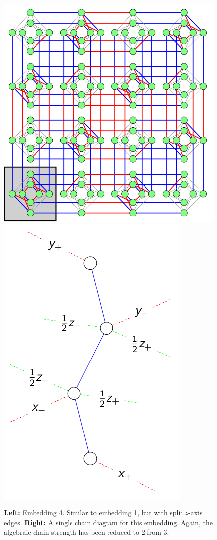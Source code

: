 \documentclass[11pt]{report}
\newcommand{\?}{\stackrel{?}{=}}
\begin{document}
\begin{figure}[h!]
  \centerline{\includegraphics[width=\linewidth/3]{resources/images/emb4.png}\hspace{1cm}\includegraphics[height=\linewidth/3]{resources/images/emb4_chain.png}}
  \caption{\textbf{Left:} Embedding 4. Similar to embedding 1, but with split $z$-axis edges. \textbf{Right:} A single chain diagram for this embedding. Again, the algebraic chain strength has been reduced to 2 from 3.}
  \label{fig:boat1}
\end{figure}
\end{document}
